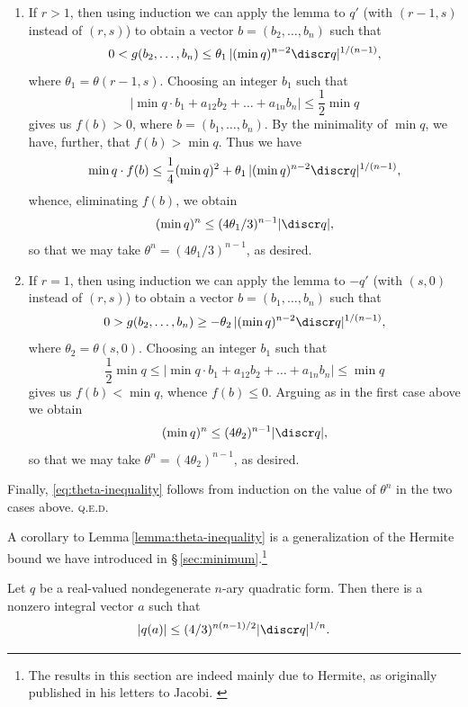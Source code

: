 \medskip

\begin{enumerate}[wide, nosep, label=(\roman*)]
    \item If \(r > 1\), then using induction we can apply the lemma to \(q'\) (with \((r-1, s)\) instead of \((r, s)\)) to obtain a vector \(b = (b_2, \dots, b_n)\) such that
    \[
        0 < g(b_2, \dots, b_n) \leq \theta_1\,|(\min q)^{n-2} \discr q|^{1/(n-1)},
    \]
    where \(\theta_1 = \theta(r-1, s)\). Choosing an integer \(b_1\) such that
    \[
        |\min q\cdot b_1 + a_{12} b_2 + \dots + a_{1n} b_n| \leq \frac{1}{2}\min q
    \]
    gives us \(f(b) > 0\), where \(b = (b_1, \dots, b_n)\). By the minimality of \(\min q\), we have, further, that \(f(b) > \min q\). Thus we have
    \[
        \min q \cdot f(b) \leq \frac{1}{4}(\min q)^2 + \theta_1\,|(\min q)^{n-2} \discr q|^{1/(n-1)},
    \]
    whence, eliminating \(f(b)\), we obtain
    \[
        (\min q)^n \leq (4\theta_1/3)^{n-1} |\discr q|,
    \]
    so that we may take \(\theta^n = (4\theta_1/3)^{n-1}\), as desired.

    \item If \(r = 1\), then using induction we can apply the lemma to \(-q'\) (with \((s,0)\) instead of \((r, s)\)) to obtain a vector \(b = (b_1, \dots, b_n)\) such that
    \[
        0 > g(b_2, \dots, b_n) \geq -\theta_2\,|(\min q)^{n-2} \discr q|^{1/(n-1)},
    \]
    where \(\theta_2 = \theta(s, 0)\). Choosing an integer \(b_1\) such that
    \[
        \frac{1}{2}\min q \leq |\min q\cdot b_1 + a_{12} b_2 + \dots + a_{1n} b_n| \leq \min q
    \]
    gives us \(f(b) < \min q\), whence \(f(b) \leq 0\). Arguing as in the first case above we obtain
    \[
        (\min q)^n \leq (4\theta_2)^{n-1} |\discr q|,
    \]
    so that we may take \(\theta^n = (4\theta_2)^{n-1}\), as desired.
\end{enumerate}

Finally, \eqref{eq:theta-inequality} follows from induction on the value of \(\theta^n\) in the two cases above. {\scshape q.e.d.}

\medskip

A corollary to Lemma\,\ref{lemma:theta-inequality} is a generalization of the Hermite bound we have introduced in \S\,\ref{sec:minimum}.\footnote{The results in this section are indeed mainly due to Hermite, as originally published in his letters to Jacobi. \cite{hermite1850extraits}}

\begin{corollary}
    Let \(q\) be a real-valued nondegenerate \(n\)-ary quadratic form. Then there is a nonzero integral vector \(a\) such that
    \[
        |q(a)| \leq (4/3)^{n(n-1)/2} |\discr q|^{1/n}.
    \]
\end{corollary}

